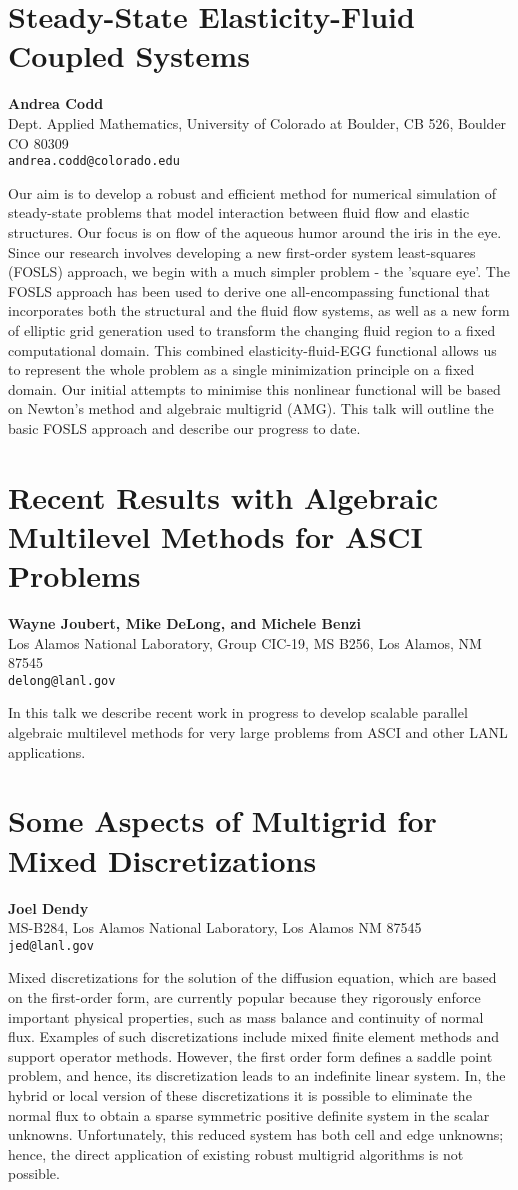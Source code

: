 \documentclass[11pt]{article}
\newcommand{\nextab}[4]{
	\section{#2}
	{\bf #1} \\ \nopagebreak
	{#3} \\ \nopagebreak
	{\tt #4} \nopagebreak
	}
\begin{document}
\nextab{Andrea Codd}
	{Steady-State Elasticity-Fluid Coupled Systems}
	{Dept. Applied Mathematics,
		University of Colorado at Boulder,
		CB 526, Boulder CO 80309}
	{andrea.codd@colorado.edu}

Our aim is to develop a robust and efficient method for numerical
simulation of steady-state problems that model interaction between fluid
flow and elastic structures.  Our focus is on flow of the aqueous humor
around the iris in the eye.  Since our research involves developing a new
first-order system least-squares (FOSLS) approach, we begin with a much
simpler problem - the 'square eye'. The FOSLS approach has been used to
derive one all-encompassing functional that incorporates both the
structural and the fluid flow systems, as well as a new form of elliptic
grid generation used to transform the changing fluid region to a fixed
computational domain.  This combined elasticity-fluid-EGG functional
allows us to represent the whole problem as a single minimization
principle on a fixed domain. Our initial attempts to minimise this
nonlinear functional will be based on Newton's method and algebraic
multigrid (AMG). This talk will outline the basic FOSLS approach and
describe our progress to date.


\nextab{Wayne Joubert, Mike DeLong, and Michele Benzi}
	{Recent Results with Algebraic Multilevel Methods for ASCI Problems}
	{Los Alamos National Laboratory,
		Group CIC-19, MS B256,
		Los Alamos, NM 87545}
	{delong@lanl.gov}

In this talk we describe recent work in progress to develop
scalable parallel algebraic multilevel methods for very large problems
from ASCI and other LANL applications.


\nextab{Joel Dendy}
	{Some Aspects of Multigrid for Mixed Discretizations}
	{MS-B284,
		Los Alamos National Laboratory,
		Los Alamos NM 87545}
	{jed@lanl.gov}

Mixed discretizations for the solution of the diffusion equation,
which are based on the first-order form, are currently popular because
they rigorously enforce important physical properties, such as mass
balance and continuity of normal flux.  Examples of such
discretizations include mixed finite element methods and support
operator methods.  However, the first order form defines a saddle
point problem, and hence, its discretization leads to an indefinite
linear system.  In, the hybrid or local version of these
discretizations it is possible to eliminate the normal flux to obtain
a sparse symmetric positive definite system in the scalar unknowns.
Unfortunately, this reduced system has both cell and edge unknowns;
hence, the direct application of existing robust multigrid algorithms
is not possible.
\end{document}
